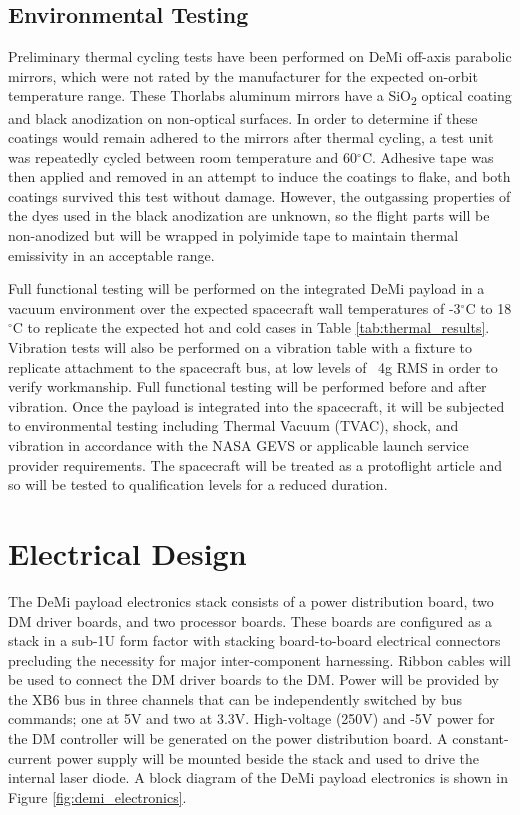 \documentclass[]{spie}  %
\begin{document}
\subsection{Environmental Testing}%
Preliminary thermal cycling tests have been performed on DeMi off-axis parabolic mirrors, which were not rated by the manufacturer for the expected on-orbit temperature range. These Thorlabs aluminum mirrors have a SiO\textsubscript{2} optical coating and black anodization on non-optical surfaces. In order to determine if these coatings would remain adhered to the mirrors after thermal cycling, a test unit was repeatedly cycled between room temperature and 60$^{\circ}$C. Adhesive tape was then applied and removed in an attempt to induce the coatings to flake, and both coatings survived this test without damage. However, the outgassing properties of the dyes used in the black anodization are unknown, so the flight parts will be non-anodized but will be wrapped in polyimide tape to maintain thermal emissivity in an acceptable range.

Full functional testing will be performed on the integrated DeMi payload in a vacuum environment over the expected spacecraft wall temperatures of -3$^\circ$C to 18$^\circ$C to replicate the expected hot and cold cases in Table \ref{tab:thermal_results}. Vibration tests will also be performed on a vibration table with a fixture to replicate attachment to the spacecraft bus, at low levels of ~4g RMS in order to verify workmanship. Full functional testing will be performed before and after vibration. Once the payload is integrated into the spacecraft, it will be subjected to environmental testing including Thermal Vacuum (TVAC), shock, and vibration in accordance with the NASA GEVS \cite{milne_general_2003} or applicable launch service provider requirements. The spacecraft will be treated as a protoflight article and so will be tested to qualification levels for a reduced duration.


\section{Electrical Design}%
\label{sec:electrical}
The DeMi payload electronics stack consists of a power distribution board, two DM driver boards, and two processor boards. These boards are configured as a stack in a sub-1U form factor with stacking board-to-board electrical connectors precluding the necessity for major inter-component harnessing. Ribbon cables will be used to connect the DM driver boards to the DM. Power will be provided by the XB6 bus in three channels that can be independently switched by bus commands; one at 5V and two at 3.3V. High-voltage (250V) and -5V power for the DM controller will be generated on the power distribution board. A constant-current power supply will be mounted beside the stack and used to drive the internal laser diode. A block diagram of the DeMi payload electronics is shown in Figure \ref{fig:demi_electronics}.
\end{document}
